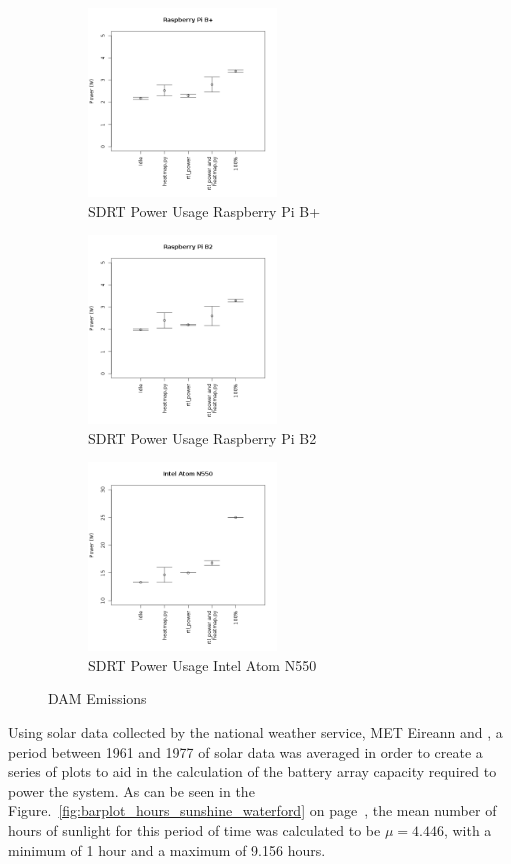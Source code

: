 %
\begin{figure}	
	\centering
	\begin{subfigure}[t]{5cm}
		\centering
		\includegraphics[width=5cm]{images/59}
		\caption{SDRT Power Usage Raspberry Pi B+}
		\label{fig:sdrt_power_usage_pi_b}		
	\end{subfigure}
	\quad
	\begin{subfigure}[t]{5cm}
		\centering
		\includegraphics[width=5cm]{images/60}
		\caption{SDRT Power Usage Raspberry Pi B2}
		\label{fig:sdrt_power_usage_pi_b2}
	\end{subfigure}
	\quad
	\begin{subfigure}[t]{5cm}
		\centering
		\includegraphics[width=5cm]{images/61}
		\caption{SDRT Power Usage Intel Atom N550}
		\label{fig:sdrt_power_usage_atom_n55}
	\end{subfigure}
	\caption{DAM Emissions}
	\label{fig:jupiter_dam}
\end{figure}
%


\newpage
Using solar data collected by the national weather service, MET Eireann \citep{MET-15} and \citep{ECAD-15}, a period between 1961 and 1977 of solar data was averaged in order to create a series of plots to aid in the calculation of the battery array capacity required to power the system. As can be seen in the Figure.~\ref{fig:barplot_hours_sunshine_waterford} on page~\pageref{fig:barplot_hours_sunshine_waterford}, the mean number of hours of sunlight for this period of time was calculated to be $\mu = 4.446$, with a minimum of 1 hour and a maximum of 9.156 hours.

